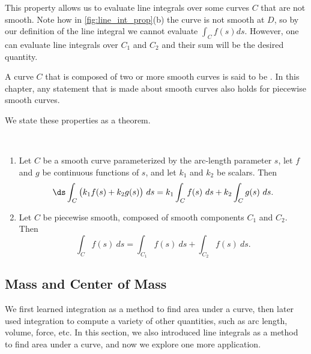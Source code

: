 This property allows us to evaluate line integrals over some curves $C$ that are not smooth. Note how in \autoref{fig:line_int_prop}(b) the curve is not smooth at $D$, so by our definition of the line integral we cannot evaluate $\int_C f(s)ds$. However, one can evaluate line integrals over $C_1$ and $C_2$ and their sum will be the desired quantity.

A curve $C$ that is composed of two or more smooth curves is said to be . In this chapter, any statement that is made about smooth curves also holds for piecewise smooth curves.


We state these properties as a theorem.

{%
\mbox{}\\[-2\baselineskip]\begin{enumerate}
	\item	Let $C$ be a smooth curve parameterized by the arc-length parameter $s$, let $f$ and $g$ be continuous functions of $s$, and let $k_1$ and $k_2$ be scalars. Then
\[\ds \int_C\big(k_1f(s)+k_2g(s)\big)\ ds = k_1\int_Cf(s)\ ds +k_2\int_Cg(s)\ ds.\]
	\item Let $C$ be piecewise smooth, composed of smooth components $C_1$ and $C_2$. Then
\[\int_Cf(s)\ ds = \int_{C_1}f(s)\ ds + \int_{C_2}f(s)\ ds.\]
\end{enumerate}}

\subsection{Mass and Center of Mass}

We first learned integration as a method to find area under a curve, then later used integration to compute a variety of other quantities, such as arc length, volume, force, etc. In this section, we also introduced line integrals as a method to find area under a curve, and now we explore one more application.

